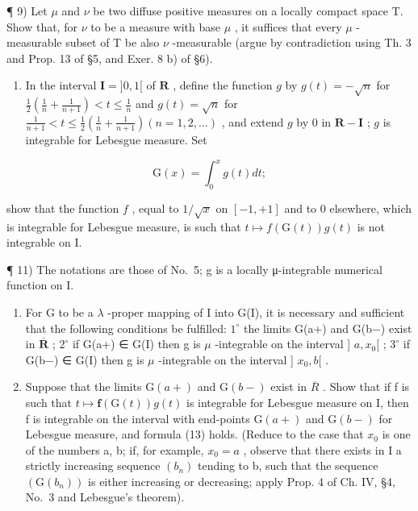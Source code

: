 ¶ 9) Let \(\mu\) and \(\nu\) be two diffuse positive measures on a locally compact space T. Show that, for \(\nu\) to be a measure with base \(\mu\) , it suffices that every \(\mu\) -measurable subset of T be also \(\nu\) -measurable (argue by contradiction using Th. 3 and Prop. 13 of §5, and Exer. 8 b) of §6).

\begin{enumerate}
\def\labelenumi{\arabic{enumi})}
\setcounter{enumi}{9}
\tightlist
\item
  In the interval \(\mathbf{I} = ]0,1[\) of \(\mathbf{R}\) , define the function \(g\) by \(g(t) = -\sqrt{n}\) for \(\frac{1}{2}\left(\frac{1}{n} + \frac{1}{n+1}\right) < t \leqslant \frac{1}{n}\) and \(g(t) = \sqrt{n}\) for \(\frac{1}{n+1} < t \leqslant \frac{1}{2}\left(\frac{1}{n} + \frac{1}{n+1}\right) (n = 1,2,\ldots)\) , and extend \(g\) by 0 in \(\mathbf{R} - \mathbf{I}\) ; \(g\) is integrable for Lebesgue measure. Set
\end{enumerate}

\[
\mathrm{G} (x) = \int_ {0} ^ {x} g (t) d t;
\]

show that the function \(f\) , equal to \(1 / \sqrt{x}\) on \([-1, +1]\) and to 0 elsewhere, which is integrable for Lebesgue measure, is such that \(t \mapsto f(\mathrm{G}(t))g(t)\) is not integrable on I.

¶ 11) The notations are those of No.~5; g is a locally μ-integrable numerical function on I.

\begin{enumerate}
\def\labelenumi{\alph{enumi})}
\item
  For G to be a \(\lambda\) -proper mapping of I into G(I), it is necessary and sufficient that the following conditions be fulfilled: \(1^{\circ}\) the limits G(a+) and G(b−) exist in \(\overline{\mathbf{R}}\) ; \(2^{\circ}\) if G(a+) ∈ G(I) then g is \(\mu\) -integrable on the interval {]} \(a, x_0[\) ; \(3^{\circ}\) if G(b−) ∈ G(I) then g is \(\mu\) -integrable on the interval {]} \(x_0, b[\) .
\item
  Suppose that the limits \(\mathrm{G}(a+)\) and \(\mathrm{G}(b-)\) exist in \(\overline{R}\) . Show that if f is such that \(t \mapsto \mathbf{f}(\mathrm{G}(t))g(t)\) is integrable for Lebesgue measure on I, then f is integrable on the interval with end-points \(\mathrm{G}(a+)\) and \(\mathrm{G}(b-)\) for Lebesgue measure, and formula (13) holds. (Reduce to the case that \(x_{0}\) is one of the numbers a, b; if, for example, \(x_{0} = a\) , observe that there exists in I a strictly increasing sequence \((b_{n})\) tending to b, such that the sequence \((\mathrm{G}(b_{n}))\) is either increasing or decreasing; apply Prop. 4 of Ch. IV, §4, No.~3 and Lebesgue's theorem).
\end{enumerate}

